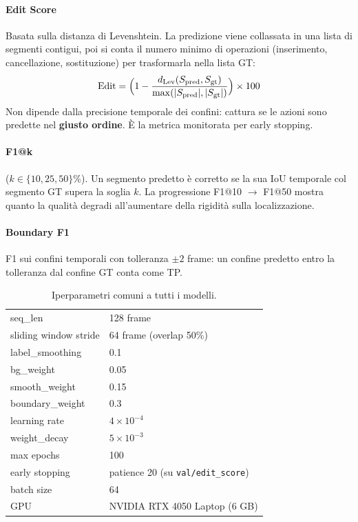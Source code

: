 \documentclass[12pt, a4paper]{article}
\begin{document}
\paragraph{Edit Score} Basata sulla distanza di Levenshtein. La predizione viene
collassata in una lista di segmenti contigui, poi si conta il numero minimo di
operazioni (inserimento, cancellazione, sostituzione) per trasformarla nella
lista GT:
\begin{equation}
  \text{Edit} = \Bigl(1 - \frac{d_{\text{Lev}}(S_{\text{pred}}, S_{\text{gt}})}
  {\max(|S_{\text{pred}}|, |S_{\text{gt}}|)}\Bigr)\times 100
\end{equation}
Non dipende dalla precisione temporale dei confini: cattura se le azioni sono
predette nel \textbf{giusto ordine}. \`E la metrica monitorata per early stopping.

\paragraph{F1@k} ($k \in \{10, 25, 50\}\%$). Un segmento predetto \`e corretto se
la sua IoU temporale col segmento GT supera la soglia $k$. La progressione
F1@10 $\to$ F1@50 mostra quanto la qualit\`a degradi all'aumentare della
rigidit\`a sulla localizzazione.

\paragraph{Boundary F1} F1 sui confini temporali con tolleranza $\pm2$ frame:
un confine predetto entro la tolleranza dal confine GT conta come TP.

\begin{table}[H]
\centering
\caption{Iperparametri comuni a tutti i modelli.}
\begin{tabular}{ll}
\toprule
seq\_len                & 128 frame \\
sliding window stride   & 64 frame (overlap 50\%) \\
label\_smoothing        & 0.1 \\
bg\_weight              & 0.05 \\
smooth\_weight          & 0.15 \\
boundary\_weight        & 0.3 \\
learning rate           & $4\times10^{-4}$ \\
weight\_decay           & $5\times10^{-3}$ \\
max epochs              & 100 \\
early stopping          & patience 20 (su \texttt{val/edit\_score}) \\
batch size              & 64 \\
GPU                     & NVIDIA RTX 4050 Laptop (6 GB) \\
\bottomrule
\end{tabular}
\end{table}
\end{document}
